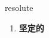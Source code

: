 
\begin{frame}
{\huge resolute}
\begin{center}
\begin{enumerate}\Large
  \item \textbf{坚定的}
\end{enumerate}
\end{center}
\end{frame}
